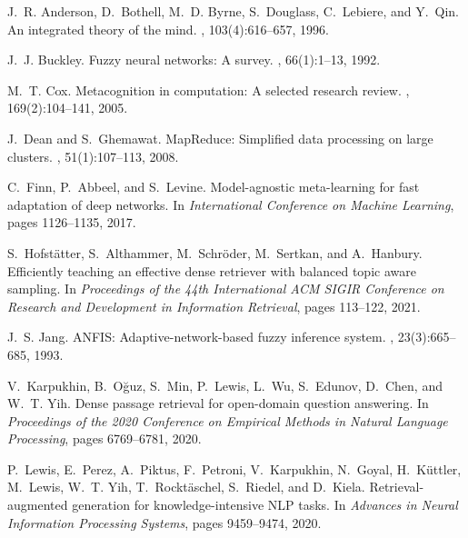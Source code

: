 \documentclass[12pt,a4paper]{article}
\begin{document}

\begin{thebibliography}{99}

J.~R. Anderson, D.~Bothell, M.~D. Byrne, S.~Douglass, C.~Lebiere, and Y.~Qin.
\newblock An integrated theory of the mind.
, 103(4):616--657, 1996.

J.~J. Buckley.
\newblock Fuzzy neural networks: A survey.
, 66(1):1--13, 1992.

M.~T. Cox.
\newblock Metacognition in computation: A selected research review.
, 169(2):104--141, 2005.

J.~Dean and S.~Ghemawat.
\newblock MapReduce: Simplified data processing on large clusters.
, 51(1):107--113, 2008.

C.~Finn, P.~Abbeel, and S.~Levine.
\newblock Model-agnostic meta-learning for fast adaptation of deep networks.
\newblock In {\em International Conference on Machine Learning}, pages 1126--1135, 2017.

S.~Hofstätter, S.~Althammer, M.~Schröder, M.~Sertkan, and A.~Hanbury.
\newblock Efficiently teaching an effective dense retriever with balanced topic aware sampling.
\newblock In {\em Proceedings of the 44th International ACM SIGIR Conference on Research and Development in Information Retrieval}, pages 113--122, 2021.

J.~S. Jang.
\newblock ANFIS: Adaptive-network-based fuzzy inference system.
, 23(3):665--685, 1993.

V.~Karpukhin, B.~Oğuz, S.~Min, P.~Lewis, L.~Wu, S.~Edunov, D.~Chen, and W.~T. Yih.
\newblock Dense passage retrieval for open-domain question answering.
\newblock In {\em Proceedings of the 2020 Conference on Empirical Methods in Natural Language Processing}, pages 6769--6781, 2020.

P.~Lewis, E.~Perez, A.~Piktus, F.~Petroni, V.~Karpukhin, N.~Goyal, H.~Küttler, M.~Lewis, W.~T. Yih, T.~Rocktäschel, S.~Riedel, and D.~Kiela.
\newblock Retrieval-augmented generation for knowledge-intensive NLP tasks.
\newblock In {\em Advances in Neural Information Processing Systems}, pages 9459--9474, 2020.


\end{thebibliography}
\end{document}

